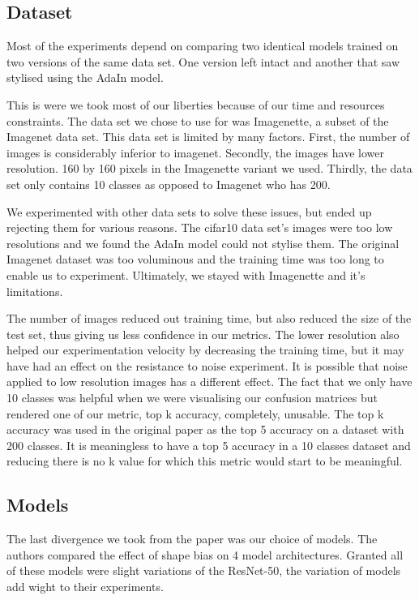 \documentclass{article}
\begin{document}
\subsection{Dataset}

Most of the experiments depend on comparing two identical models trained on two versions of the same data set. One version left intact and another that saw stylised using the AdaIn model.

This is were we took most of our liberties because of our time and resources constraints.
The data set we chose to use for was Imagenette, a subset of the Imagenet data set.
This data set is limited by many factors. First, the number of images is considerably inferior to imagenet. Secondly, the images have lower resolution. 160 by 160 pixels in the Imagenette variant we used. Thirdly, the data set only contains 10 classes as opposed to Imagenet who has 200.

We experimented with other data sets to solve these issues, but ended up rejecting them for various reasons. The cifar10 data set's images were too low resolutions and we found the AdaIn model could not stylise them.
The original Imagenet dataset was too voluminous and the training time was too long to enable us to experiment.
Ultimately, we stayed with Imagenette and it's limitations.

The number of images reduced out training time, but also reduced the size of the test set, thus giving us less confidence in our metrics.
The lower resolution also helped our experimentation velocity by decreasing the training time, but it may have had an effect on the resistance to noise experiment. It is possible that noise applied to low resolution images has a different effect.
The fact that we only have 10 classes was helpful when we were visualising our confusion matrices but rendered one of our metric, top k accuracy, completely, unusable. The top k accuracy was used in the original paper as the top 5 accuracy on a dataset with 200 classes. It is meaningless to have a top 5 accuracy in a 10 classes dataset and reducing there is no k value for which this metric would start to be meaningful.

\subsection{Models}

The last divergence we took from the paper was our choice of models. The authors compared the effect of shape bias on 4 model architectures. Granted all of these models were slight variations of the ResNet-50, the variation of models add wight to their experiments.
\end{document}
